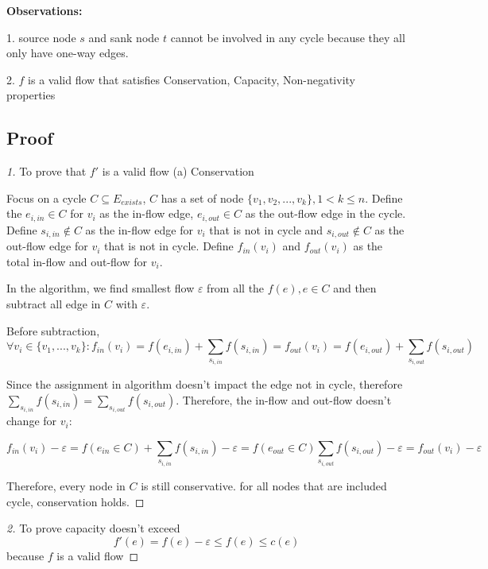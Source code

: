 \documentclass[openany]{article}
\begin{document}
\textbf{Observations:}

1. source node $s$ and sank node $t$ cannot be involved in any cycle because they all only have one-way edges.

2. $f$ is a valid flow that satisfies Conservation, Capacity, Non-negativity properties

\subsection*{Proof}
\begin{proof}[1]{To prove that $f'$ is a valid flow}
(a) Conservation

Focus on a cycle $C \subseteq E_{exists}$, $C$ has a set of node $\{v_1, v_2, ..., v_k\}, 1 < k \leq n$. Define the $e_{i,in} \in C$ for $v_i$ as the in-flow edge, $e_{i,out} \in C$ as the out-flow edge in the cycle. Define $s_{i,in} \notin C$ as the in-flow edge for $v_i$ that is not in cycle and $s_{i,out} \notin C$ as the out-flow edge for $v_i$ that is not in cycle. Define $f_{in}(v_i)$ and $f_{out}(v_i)$ as the total in-flow and out-flow for $v_i$.

In the algorithm, we find smallest flow $\varepsilon$ from all the $f(e), e\in C$ and then subtract all edge in $C$ with $\varepsilon$.

Before subtraction, \[\forall v_i \in \{v_1, ..., v_k\}: f_{in}(v_i) = f(e_{i,in}) + \sum_{s_{i,in}} f(s_{i,in}) = f_{out}(v_i) = f(e_{i,out})+\sum_{s_{i,out}} f(s_{i,out}) \]

Since the assignment in algorithm doesn't impact the edge not in cycle, therefore $\sum_{s_{i,in}} f(s_{i,in}) = \sum_{s_{i,out}} f(s_{i,out})$. Therefore, the in-flow and out-flow doesn't change for $v_i$:

\[f_{in}(v_i) - \varepsilon = f(e_{in} \in C) + \sum_{s_{i,in}} f(s_{i,in}) - \varepsilon = f(e_{out} \in C) \sum_{s_{i,out}} f(s_{i,out}) - \varepsilon = f_{out}(v_i) - \varepsilon\]

Therefore, every node in $C$ is still conservative. for all nodes that are included cycle, conservation holds.


\end{proof}

\begin{proof}[2]{To prove capacity doesn't exceed}
    \[f'(e) = f(e) - \varepsilon \leq f(e) \leq c(e)\] because $f$ is a valid flow
    
\end{proof}
\end{document}
